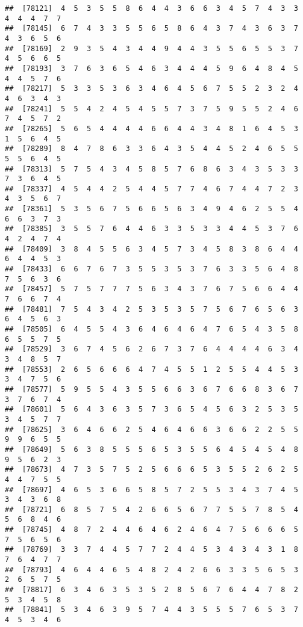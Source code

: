 \documentclass[
]{book}
\begin{document}
\begin{verbatim}
##  [78121]  4  5  3  5  5  8  6  4  4  3  6  6  3  4  5  7  4  3  3  4  4  4  7  7
##  [78145]  6  7  4  3  3  5  5  6  5  8  6  4  3  7  4  3  6  3  7  4  3  6  5  6
##  [78169]  2  9  3  5  4  3  4  4  9  4  4  3  5  5  6  5  5  3  7  4  5  6  6  5
##  [78193]  3  7  6  3  6  5  4  6  3  4  4  4  5  9  6  4  8  4  5  4  4  5  7  6
##  [78217]  5  3  3  5  3  6  3  4  6  4  5  6  7  5  5  2  3  2  4  4  6  3  4  3
##  [78241]  5  5  4  2  4  5  4  5  5  7  3  7  5  9  5  5  2  4  6  7  4  5  7  2
##  [78265]  5  6  5  4  4  4  4  6  6  4  4  3  4  8  1  6  4  5  3  1  5  6  4  5
##  [78289]  8  4  7  8  6  3  3  6  4  3  5  4  4  5  2  4  6  5  5  5  5  6  4  5
##  [78313]  5  7  5  4  3  4  5  8  5  7  6  8  6  3  4  3  5  3  3  7  3  6  4  5
##  [78337]  4  5  4  4  2  5  4  4  5  7  7  4  6  7  4  4  7  2  3  4  3  5  6  7
##  [78361]  5  3  5  6  7  5  6  6  5  6  3  4  9  4  6  2  5  5  4  6  6  3  7  3
##  [78385]  3  5  5  7  6  4  4  6  3  3  5  3  3  4  4  5  3  7  6  4  2  4  7  4
##  [78409]  3  8  4  5  5  6  3  4  5  7  3  4  5  8  3  8  6  4  4  6  4  4  5  3
##  [78433]  6  6  7  6  7  3  5  5  3  5  3  7  6  3  3  5  6  4  8  7  5  6  3  6
##  [78457]  5  7  5  7  7  7  5  6  3  4  3  7  6  7  5  6  6  4  4  7  6  6  7  4
##  [78481]  7  5  4  3  4  2  5  3  5  3  5  7  5  6  7  6  5  6  3  6  4  5  6  3
##  [78505]  6  4  5  5  4  3  6  4  6  4  6  4  7  6  5  4  3  5  8  6  5  5  7  5
##  [78529]  3  6  7  4  5  6  2  6  7  3  7  6  4  4  4  4  6  3  4  3  4  8  5  7
##  [78553]  2  6  5  6  6  6  4  7  4  5  5  1  2  5  5  4  4  5  3  3  4  7  5  6
##  [78577]  5  9  5  5  4  3  5  5  6  6  3  6  7  6  6  8  3  6  7  3  7  6  7  4
##  [78601]  5  6  4  3  6  3  5  7  3  6  5  4  5  6  3  2  5  3  5  3  4  5  7  7
##  [78625]  3  6  4  6  6  2  5  4  6  4  6  6  3  6  6  2  2  5  5  9  9  6  5  5
##  [78649]  5  6  3  8  5  5  5  6  5  3  5  5  6  4  5  4  5  4  8  9  5  6  2  3
##  [78673]  4  7  3  5  7  5  2  5  6  6  6  5  3  5  5  2  6  2  5  4  4  7  5  5
##  [78697]  4  6  5  3  6  6  5  8  5  7  2  5  5  3  4  3  7  4  5  3  4  3  6  8
##  [78721]  6  8  5  7  5  4  2  6  6  5  6  7  7  5  5  7  8  5  4  5  6  8  4  6
##  [78745]  4  8  7  2  4  4  6  4  6  2  4  6  4  7  5  6  6  6  5  7  5  6  5  6
##  [78769]  3  3  7  4  4  5  7  7  2  4  4  5  3  4  3  4  3  1  8  7  6  4  7  7
##  [78793]  4  6  4  4  6  5  4  8  2  4  2  6  6  3  3  5  6  5  3  2  6  5  7  5
##  [78817]  6  3  4  6  3  5  3  5  2  8  5  6  7  6  4  4  7  8  2  5  3  4  5  8
##  [78841]  5  3  4  6  3  9  5  7  4  4  3  5  5  5  7  6  5  3  7  4  5  3  4  6

\end{verbatim}
\end{document}
